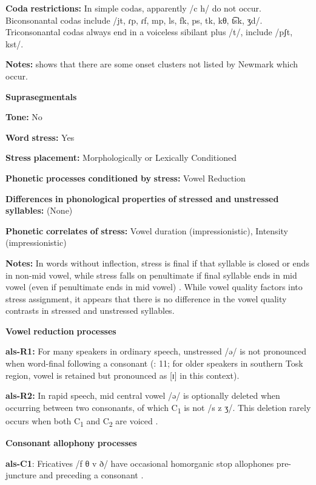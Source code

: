 \textbf{Coda} \textbf{restrictions:} In simple codas, apparently /c h/ do not occur. Biconsonantal codas include /jt, ɾp, ɾf, mp, ls, fk, ps, tk,  kθ, t͡sk, ʒd/. Triconsonantal codas always end in a voiceless sibilant plus /t/, include /pʃt, kst/.

\textbf{Notes:} \citet{Klippenstein2010} shows that there are some onset clusters not listed by Newmark which occur.

\textbf{Suprasegmentals}

\textbf{Tone:} No

\textbf{Word} \textbf{stress:} Yes

\textbf{Stress} \textbf{placement:} Morphologically or Lexically Conditioned

\textbf{Phonetic} \textbf{processes} \textbf{conditioned} \textbf{by} \textbf{stress:} Vowel Reduction

\textbf{Differences} \textbf{in} \textbf{phonological} \textbf{properties} \textbf{of} \textbf{stressed} \textbf{and} \textbf{unstressed} \textbf{syllables:} (None)

\textbf{Phonetic} \textbf{correlates} \textbf{of} \textbf{stress:} Vowel duration (impressionistic), Intensity (impressionistic)

\textbf{Notes:} In words without inflection, stress is final if that syllable is closed or ends in non-mid vowel, while stress falls on penultimate if final syllable ends in mid vowel (even if penultimate ends in mid vowel) \citep{Trommer2013}. While vowel quality factors into stress assignment, it appears that there is no difference in the vowel quality contrasts in stressed and unstressed syllables.

\textbf{Vowel} \textbf{reduction} \textbf{processes}

\textbf{als-R1:} For many speakers in ordinary speech, unstressed /ə/ is not pronounced when word-final following a consonant (\citealt{NewmarkEtAl1982}: 11; for older speakers in southern Tosk region, vowel is retained but pronounced as [ɪ] in this context).

\textbf{als-R2:} In rapid speech, mid central vowel /ə/ is optionally deleted when occurring between two consonants, of which C\textsubscript{1} is not /s z ʒ/. This deletion rarely occurs when both C\textsubscript{1} and C\textsubscript{2} are voiced \citep[21-2]{Klippenstein2010}.

\textbf{Consonant} \textbf{allophony} \textbf{processes}

\textbf{als-C1}: Fricatives /f θ v ð/ have occasional homorganic stop allophones pre-juncture and preceding a consonant \citep{Newmark1957}.

